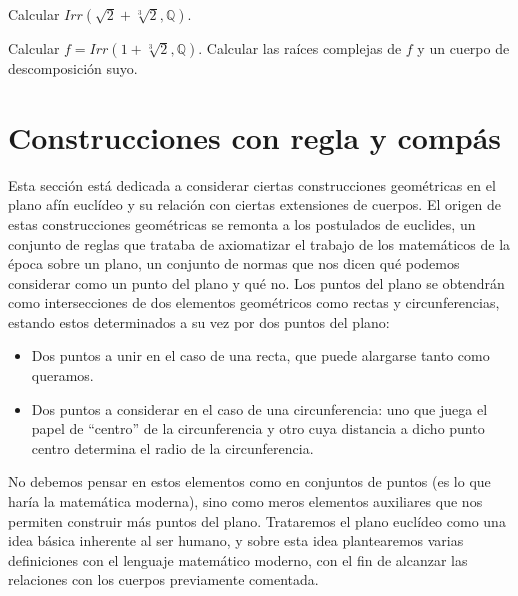 \begin{ejercicio} %
    Calcular $Irr(\sqrt{2}+\sqrt[3]{2}, \mathbb{Q})$.%
\end{ejercicio}

\begin{ejercicio} %
    Calcular $f= Irr(1+\sqrt[3]{2},\mathbb{Q})$. Calcular las raíces complejas de $f$ y un cuerpo de descomposición suyo.
\end{ejercicio}

\section{Construcciones con regla y compás}
Esta sección está dedicada a considerar ciertas construcciones geométricas en el plano afín euclídeo y su relación con ciertas extensiones de cuerpos. El origen de estas construcciones geométricas se remonta a los postulados de euclides, un conjunto de reglas que trataba de axiomatizar el trabajo de los matemáticos de la época sobre un plano, un conjunto de normas que nos dicen qué podemos considerar como un punto del plano y qué no. Los puntos del plano se obtendrán como intersecciones de dos elementos geométricos como rectas y circunferencias, estando estos determinados a su vez por dos puntos del plano:
\begin{itemize}
    \item Dos puntos a unir en el caso de una recta, que puede alargarse tanto como queramos.
    \item Dos puntos a considerar en el caso de una circunferencia: uno que juega el papel de ``centro'' de la circunferencia y otro cuya distancia a dicho punto centro determina el radio de la circunferencia.
\end{itemize}
No debemos pensar en estos elementos como en conjuntos de puntos (es lo que haría la matemática moderna), sino como meros elementos auxiliares que nos permiten construir más puntos del plano. Trataremos el plano euclídeo como una idea básica inherente al ser humano, y sobre esta idea plantearemos varias definiciones con el lenguaje matemático moderno, con el fin de alcanzar las relaciones con los cuerpos previamente comentada.\\

